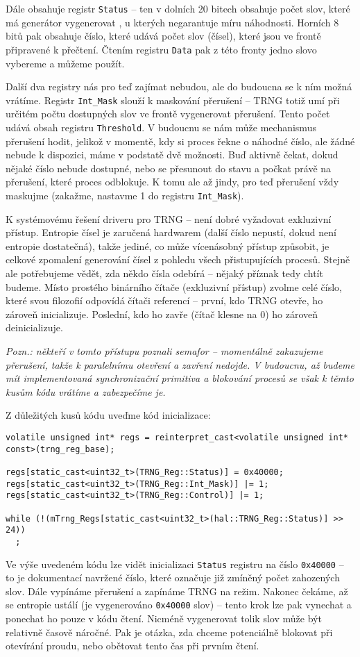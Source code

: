 \documentclass{article}
\begin{document}
Dále obsahuje registr \texttt{Status} -- ten v dolních 20 bitech obsahuje počet slov, které má generátor vygenerovat , u kterých negarantuje míru náhodnosti. Horních 8 bitů pak obsahuje číslo, které udává počet slov (čísel), které jsou ve frontě připravené k přečtení. Čtením registru \texttt{Data} pak z této fronty jedno slovo vybereme a můžeme použít.

Další dva registry nás pro teď zajímat nebudou, ale do budoucna se k ním možná vrátíme. Registr \texttt{Int\_Mask} slouží k maskování přerušení -- TRNG totiž umí při určitém počtu dostupných slov ve frontě vygenerovat přerušení. Tento počet udává obsah registru \texttt{Threshold}. V budoucnu se nám může mechanismus přerušení hodit, jelikož v momentě, kdy si proces řekne o náhodné číslo, ale žádné nebude k dispozici, máme v podstatě dvě možnosti. Buď aktivně čekat, dokud nějaké číslo nebude dostupné, nebo se přesunout do stavu  a počkat právě na přerušení, které proces odblokuje. K tomu ale až jindy, pro teď přerušení vždy maskujme (zakažme, nastavme 1 do registru \texttt{Int\_Mask}).

K systémovému řešení driveru pro TRNG -- není dobré vyžadovat exkluzivní přístup. Entropie čísel je zaručená hardwarem (další číslo nepustí, dokud není entropie dostatečná), takže jediné, co může vícenásobný přístup způsobit, je celkové zpomalení generování čísel z pohledu všech přistupujících procesů. Stejně ale potřebujeme vědět, zda někdo čísla odebírá -- nějaký příznak tedy chtít budeme. Místo prostého binárního čítače (exkluzivní přístup) zvolme celé číslo, které svou filozofií odpovídá čítači referencí -- první, kdo TRNG otevře, ho zároveň inicializuje. Poslední, kdo ho zavře (čítač klesne na 0) ho zároveň deinicializuje.

\emph{Pozn.: někteří v tomto přístupu poznali semafor -- momentálně zakazujeme přerušení, takže k paralelnímu otevření a zavření nedojde. V budoucnu, až budeme mít implementovaná synchronizační primitiva a blokování procesů se však k těmto kusům kódu vrátíme a zabezpečíme je.}

Z důležitých kusů kódu uveďme kód inicializace:
\begin{lstlisting}
volatile unsigned int* regs = reinterpret_cast<volatile unsigned int* const>(trng_reg_base);
	
regs[static_cast<uint32_t>(TRNG_Reg::Status)] = 0x40000;
regs[static_cast<uint32_t>(TRNG_Reg::Int_Mask)] |= 1;
regs[static_cast<uint32_t>(TRNG_Reg::Control)] |= 1;

while (!(mTrng_Regs[static_cast<uint32_t>(hal::TRNG_Reg::Status)] >> 24))
  ;
\end{lstlisting}
Ve výše uvedeném kódu lze vidět inicializaci \texttt{Status} registru na číslo \texttt{0x40000} -- to je dokumentací navržené číslo, které označuje již zmíněný počet zahozených slov. Dále vypínáme přerušení a zapínáme TRNG na  režim. Nakonec čekáme, až se entropie ustálí (je vygenerováno \texttt{0x40000} slov) -- tento krok lze pak vynechat a ponechat ho pouze v kódu čtení. Nicméně vygenerovat tolik slov může být relativně časově náročné. Pak je otázka, zda chceme potenciálně blokovat při otevírání proudu, nebo obětovat tento čas při prvním čtení.
\end{document}
